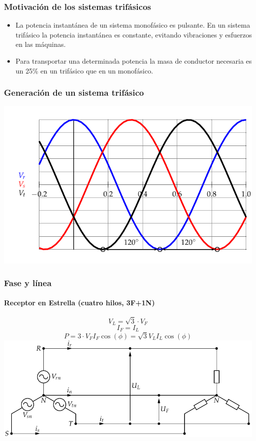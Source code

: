 \documentclass[serif, xcolor=dvipsnames]{beamer}
\begin{document}
\begin{frame}
  \frametitle{Motivación de los sistemas trifásicos}
  \begin{itemize}
  \item La potencia instantánea de un sistema monofásico es
    pulsante. En un sistema trifásico la potencia instantánea es
    constante, evitando vibraciones y esfuerzos en las máquinas.
  \item Para transportar una determinada potencia la masa de conductor
    necesaria es un 25\% en un trifásico que en un monofásico.
  \end{itemize}

\end{frame}
\begin{frame}[plain]
  \frametitle{Generación de un sistema trifásico}

  \begin{center}
    \includegraphics{../figs/TensionesTrifasica}
    \par\end{center}


\end{frame}
\begin{frame}[plain]
  \frametitle{Fase y línea}


  \framesubtitle{Receptor en Estrella (cuatro hilos, 3F+1N)}
  \begin{block} {}

    \begin{center}
      \[
      V_{L}=\sqrt{3}\cdot V_{F}
      \]
      \[
      I_{F}=I_{L}
      \]
      \[
      P=3\cdot V_{F}I_{F}\cos(\phi)=\sqrt{3}V_{L}I_{L}\cos(\phi)
      \]
      \includegraphics[scale=0.75]{../figs/RedTrifasicaEstrella}
      \par\end{center}

  \end{block}

\end{frame}
\end{document}
